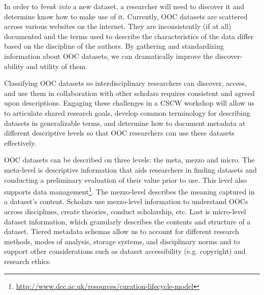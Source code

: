 In order to \emph{break into} a new dataset, a researcher will need to discover it and determine know how to make use of it.  Currently, OOC datasets are scattered across various websites on the internet.  They are inconsistently (if at all) documented and the terms used to describe the characteristics of the data differ based on the discipline of the authors.  By gathering and standardizing information about OOC datasets, we can dramatically improve the discover-ability and utility of them.

Classifying OOC datasets so interdisciplinary researchers can discover, access, and use them in collaboration with other scholars requires consistent and agreed upon descriptions. Engaging these challenges in a CSCW workshop will allow us to articulate shared research goals, develop common terminology for describing datasets in generalizable terms, and determine how to document metadata at different descriptive levels so that OOC researchers can use these datasets effectively. 

OOC datasets can be described on three levels: the meta, mezzo and micro.  The meta-level is descriptive information that aids researchers in finding datasets and conducting a preliminary evaluation of their value prior to use.  This level also supports data management\footnote{\url{http://www.dcc.ac.uk/resources/curation-lifecycle-model}}.  The mezzo-level describes the meaning captured in a dataset's content.  Scholars use mezzo-level information to understand OOCs across disciplines, create theories, conduct scholarship, etc.  Last is micro-level dataset information, which granularly describes the contents and structure of a dataset. Tiered metadata schemas allow us to account for different research methods, modes of analysis, storage systems, and disciplinary norms and to support other considerations such as dataset accessibility (e.g. copyright) and research ethics.
